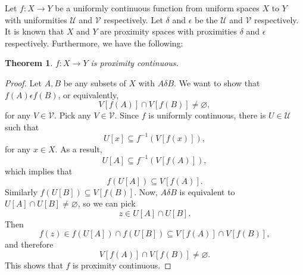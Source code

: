 \documentclass[12pt]{article}
\newtheorem{thm}{Theorem}
\begin{document}
Let $f:X\to Y$ be a uniformly continuous function from uniform spaces $X$ to $Y$ with uniformities $\mathcal{U}$ and $\mathcal{V}$ respectively.  Let $\delta$ and $\epsilon$ be the  $\mathcal{U}$ and $\mathcal{V}$ respectively.  It is known that $X$ and $Y$ are proximity spaces with proximities $\delta$ and $\epsilon$ respectively.  Furthermore, we have the following:

\begin{thm} $f:X\to Y$ is proximity continuous. \end{thm}

\begin{proof}  
Let $A,B$ be any subsets of $X$ with $A\delta B$.  We want to show that $f(A)\epsilon f(B)$, or equivalently, $$V[f(A)]\cap V[f(B)]\ne \varnothing,$$ for any $V\in \mathcal{V}$.  Pick any $V\in \mathcal{V}$.  Since $f$ is uniformly continuous, there is $U\in \mathcal{U}$ such that $$U[x]\subseteq f^{-1}(V[f(x)]),$$ for any $x\in X$.  As a result, $$U[A]\subseteq f^{-1}(V[f(A)]),$$ which implies that $$f(U[A]) \subseteq V[f(A)].$$  Similarly $f(U[B])\subseteq V[f(B)]$.  Now, $A\delta B$ is equivalent to $U[A]\cap U[B]\ne \varnothing$, so we can pick $$z\in U[A]\cap U[B].$$  Then $$f(z)\in f(U[A])\cap f(U[B])\subseteq V[f(A)]\cap V[f(B)],$$ and therefore $$V[f(A)]\cap V[f(B)]\ne \varnothing.$$  This shows that $f$ is proximity continuous.
\end{proof}
\end{document}
